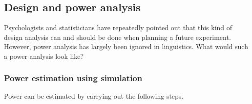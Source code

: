 \documentclass{ar-1col}\usepackage[]{graphicx}\usepackage[]{color}
\begin{document}
\subsection{Design and power analysis}

 Psychologists and statisticians have repeatedly pointed out \citep{cohen1962statistical,powerbookcohen,gelmancarlin,moerbeek2015power} that this kind of design analysis can and should be done when planning a future experiment. However, power analysis has largely been ignored in linguistics. What would such a power analysis look like?

\subsubsection{Power estimation using simulation}

Power can be estimated by carrying out the following steps.
\end{document}
